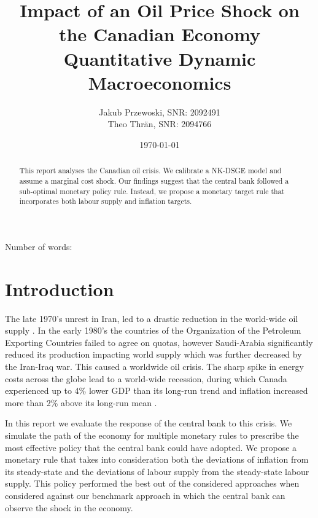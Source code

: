 \documentclass[12pt]{article}
\title{\textbf{Impact of an Oil Price Shock on the Canadian Economy} \\ \large{Quantitative Dynamic Macroeconomics}}
\author{Jakub Przewoski, SNR: 2092491\\ Theo Thrän, SNR: 2094766}
\date{\today}
\begin{document}
\maketitle
{}

\begin{center}
    \large
    Number of words:
    
    \vfill{}
    \begin{abstract}
        This report analyses the Canadian oil crisis. We calibrate a NK-DSGE model and assume a marginal cost shock. Our findings suggest that the central bank followed a sub-optimal monetary policy rule. Instead, we propose a monetary target rule that incorporates both labour supply and inflation targets. 
    \end{abstract}
\end{center}

\newpage

\tableofcontents{}

\newpage

\section{Introduction}
The late 1970's unrest in Iran, led to a drastic reduction in the world-wide oil supply \parencite{OilSqueeze1979}. In the early 1980's the countries of the Organization of the Petroleum Exporting Countries failed to agree on quotas, however Saudi-Arabia significantly reduced its production impacting world supply \parencite{tagliabueOPECFAILSSET1982} which was further decreased by the Iran-Iraq war. This caused a worldwide oil crisis. The sharp spike in energy costs across the globe lead to a world-wide recession, during which Canada experienced up to 4\% lower GDP than its long-run trend and inflation increased more than 2\% above its long-run mean 
\parencite{koseGlobalRecessions2020,worldbank_inflation_ca,fred_gdp_per_capita_ca}.

In this report we evaluate the response of the central bank to this crisis. We simulate the path of the economy for multiple monetary rules to prescribe the most effective policy that the central bank could have adopted. We propose a monetary rule that takes into consideration both the deviations of inflation from its steady-state and the deviations of labour supply from the steady-state labour supply. This policy performed the best out of the considered approaches when considered against our benchmark approach in which the central bank can observe the shock in the economy.
\end{document}
